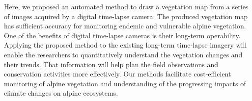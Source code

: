 \documentclass{article}
\begin{document}
Here, we proposed an automated method to draw a vegetation map from a series of images acquired by a digital time-lapse camera. The produced vegetation map has sufficient accuracy for monitoring endemic and vulnerable alpine vegetation. One of the benefits of digital time-lapse cameras is their long-term operability. Applying the proposed method to the existing long-term time-lapse imagery will enable the researchers to quantitatively understand the vegetation changes and their trends. That information will help plan the field observations and conservation activities more effectively. Our methods facilitate cost-efficient monitoring of alpine vegetation and understanding of the progressing impacts of climate changes on alpine ecosystems.



\end{document}
